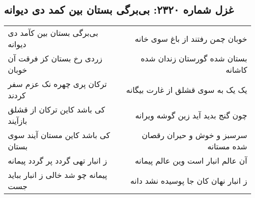 \begin{center}
\section*{غزل شماره ۲۳۲۰: بی‌برگی بستان بین کمد دی دیوانه}
\label{sec:2320}
\begin{longtable}{l p{0.5cm} r}
بی‌برگی بستان بین کآمد دی دیوانه
&&
خوبان چمن رفتند از باغ سوی خانه
\\
زردی رخ بستان کز فرقت آن خوبان
&&
بستان شده گورستان زندان شده کاشانه
\\
ترکان پری چهره نک عزم سفر کردند
&&
یک یک به سوی قشلق از غارت بیگانه
\\
کی باشد کاین ترکان از قشلق بازآیند
&&
چون گنج بدید آید زین گوشه ویرانه
\\
کی باشد کاین مستان آیند سوی بستان
&&
سرسبز و خوش و حیران رقصان شده مستانه
\\
ز انبار تهی گردد پر گردد پیمانه
&&
آن عالم انبار است وین عالم پیمانه
\\
پیمانه چو شد خالی ز انبار بباید جست
&&
ز انبار نهان کان جا پوسیده نشد دانه
\\
\end{longtable}
\end{center}
